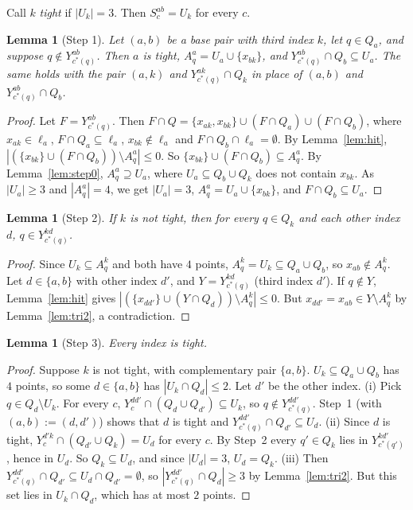 \documentclass[11pt]{amsart}
\newtheorem{lemma}[theorem]{Lemma}
\theoremstyle{definition}
\begin{document}
Call $k$ \emph{tight} if $|U_k|=3$. Then $S^{ab}_c=U_k$ for every $c$.

\begin{lemma}[Step 1]\label{lem:step1}
Let $(a,b)$ be a base pair with third index $k$, let $q\in Q_a$, and suppose $q\notin Y^{ab}_{c^*(q)}$. Then $a$ is tight, $A^a_q=U_a\cup\{x_{bk}\}$, and $Y^{ab}_{c^*(q)}\cap Q_b\subseteq U_a$. The same holds with the pair $(a,k)$ and $Y^{ak}_{c^*(q)}\cap Q_k$ in place of $(a,b)$ and $Y^{ab}_{c^*(q)}\cap Q_b$.
\end{lemma}
\begin{proof}
Let $F=Y^{ab}_{c^*(q)}$. Then $F\cap Q=\{x_{ak},x_{bk}\}\cup(F\cap Q_a)\cup(F\cap Q_b)$, where $x_{ak}\in\ell_a$, $F\cap Q_a\subseteq\ell_a$, $x_{bk}\notin\ell_a$ and $F\cap Q_b\cap\ell_a=\emptyset$. By Lemma~\ref{lem:hit}, $|(\{x_{bk}\}\cup(F\cap Q_b))\setminus A^a_q|\le 0$. So $\{x_{bk}\}\cup(F\cap Q_b)\subseteq A^a_q$. By Lemma~\ref{lem:step0}, $A^a_q\supseteq U_a$, where $U_a\subseteq Q_b\cup Q_k$ does not contain $x_{bk}$. As $|U_a|\ge3$ and $|A^a_q|=4$, we get $|U_a|=3$, $A^a_q=U_a\cup\{x_{bk}\}$, and $F\cap Q_b\subseteq U_a$.
\end{proof}

\begin{lemma}[Step 2]\label{lem:step2}
If $k$ is not tight, then for every $q\in Q_k$ and each other index $d$, $q\in Y^{kd}_{c^*(q)}$.
\end{lemma}
\begin{proof}
Since $U_k\subseteq A^k_q$ and both have $4$ points, $A^k_q=U_k\subseteq Q_a\cup Q_b$, so $x_{ab}\notin A^k_q$. Let $d\in\{a,b\}$ with other index $d'$, and $Y=Y^{kd}_{c^*(q)}$ (third index $d'$). If $q\notin Y$, Lemma~\ref{lem:hit} gives $|(\{x_{dd'}\}\cup(Y\cap Q_d))\setminus A^k_q|\le 0$. But $x_{dd'}=x_{ab}\in Y\setminus A^k_q$ by Lemma~\ref{lem:tri2}, a contradiction.
\end{proof}

\begin{lemma}[Step 3]\label{lem:step3}
Every index is tight.
\end{lemma}
\begin{proof}
Suppose $k$ is not tight, with complementary pair $\{a,b\}$. $U_k\subseteq Q_a\cup Q_b$ has $4$ points, so some $d\in\{a,b\}$ has $|U_k\cap Q_d|\le 2$. Let $d'$ be the other index.
(i) Pick $q\in Q_d\setminus U_k$. For every $c$, $Y^{dd'}_c\cap(Q_d\cup Q_{d'})\subseteq U_k$, so $q\notin Y^{dd'}_{c^*(q)}$. Step~1 (with $(a,b):=(d,d')$) shows that $d$ is tight and $Y^{dd'}_{c^*(q)}\cap Q_{d'}\subseteq U_d$.
(ii) Since $d$ is tight, $Y^{d'k}_c\cap(Q_{d'}\cup Q_k)=U_d$ for every $c$. By Step~2 every $q'\in Q_k$ lies in $Y^{kd'}_{c^*(q')}$, hence in $U_d$. So $Q_k\subseteq U_d$, and since $|U_d|=3$, $U_d=Q_k$.
(iii) Then $Y^{dd'}_{c^*(q)}\cap Q_{d'}\subseteq U_d\cap Q_{d'}=\emptyset$, so $|Y^{dd'}_{c^*(q)}\cap Q_d|\ge 3$ by Lemma~\ref{lem:tri2}. But this set lies in $U_k\cap Q_d$, which has at most $2$ points.
\end{proof}
\end{document}
